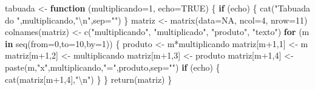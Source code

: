 \documentclass[
]{article}
\newenvironment{Shaded}{\begin{snugshade}}{\end{snugshade}}
\newcommand{\AttributeTok}[1]{\textcolor[rgb]{0.77,0.63,0.00}{#1}}
\newcommand{\ConstantTok}[1]{\textcolor[rgb]{0.00,0.00,0.00}{#1}}
\newcommand{\ControlFlowTok}[1]{\textcolor[rgb]{0.13,0.29,0.53}{\textbf{#1}}}
\newcommand{\DecValTok}[1]{\textcolor[rgb]{0.00,0.00,0.81}{#1}}
\newcommand{\FunctionTok}[1]{\textcolor[rgb]{0.00,0.00,0.00}{#1}}
\newcommand{\NormalTok}[1]{#1}
\newcommand{\OtherTok}[1]{\textcolor[rgb]{0.56,0.35,0.01}{#1}}
\newcommand{\SpecialCharTok}[1]{\textcolor[rgb]{0.00,0.00,0.00}{#1}}
\newcommand{\StringTok}[1]{\textcolor[rgb]{0.31,0.60,0.02}{#1}}
\begin{document}
\begin{Shaded}
\begin{Highlighting}[]
\NormalTok{tabuada }\OtherTok{\textless{}{-}} \ControlFlowTok{function}\NormalTok{ (}\AttributeTok{multiplicando=}\DecValTok{1}\NormalTok{, }\AttributeTok{echo=}\ConstantTok{TRUE}\NormalTok{)}
\NormalTok{\{}
  \ControlFlowTok{if}\NormalTok{ (echo)}
\NormalTok{  \{}
    \FunctionTok{cat}\NormalTok{(}\StringTok{"Tabuada do "}\NormalTok{,multiplicando,}\StringTok{"}\SpecialCharTok{\textbackslash{}n}\StringTok{"}\NormalTok{,}\AttributeTok{sep=}\StringTok{""}\NormalTok{)}
\NormalTok{  \}  }
\NormalTok{  matriz }\OtherTok{\textless{}{-}} \FunctionTok{matrix}\NormalTok{(}\AttributeTok{data=}\ConstantTok{NA}\NormalTok{, }\AttributeTok{ncol=}\DecValTok{4}\NormalTok{, }\AttributeTok{nrow=}\DecValTok{11}\NormalTok{)}
  \FunctionTok{colnames}\NormalTok{(matriz) }\OtherTok{\textless{}{-}} \FunctionTok{c}\NormalTok{(}\StringTok{"multiplicando"}\NormalTok{, }\StringTok{"multiplicado"}\NormalTok{, }\StringTok{"produto"}\NormalTok{, }\StringTok{"texto"}\NormalTok{)}
  \ControlFlowTok{for}\NormalTok{ (m }\ControlFlowTok{in} \FunctionTok{seq}\NormalTok{(}\AttributeTok{from=}\DecValTok{0}\NormalTok{,}\AttributeTok{to=}\DecValTok{10}\NormalTok{,}\AttributeTok{by=}\DecValTok{1}\NormalTok{))}
\NormalTok{  \{}
\NormalTok{    produto }\OtherTok{\textless{}{-}}\NormalTok{ m}\SpecialCharTok{*}\NormalTok{multiplicando}
\NormalTok{    matriz[m}\SpecialCharTok{+}\DecValTok{1}\NormalTok{,}\DecValTok{1}\NormalTok{] }\OtherTok{\textless{}{-}}\NormalTok{ m}
\NormalTok{    matriz[m}\SpecialCharTok{+}\DecValTok{1}\NormalTok{,}\DecValTok{2}\NormalTok{] }\OtherTok{\textless{}{-}}\NormalTok{ multiplicando}
\NormalTok{    matriz[m}\SpecialCharTok{+}\DecValTok{1}\NormalTok{,}\DecValTok{3}\NormalTok{] }\OtherTok{\textless{}{-}}\NormalTok{ produto}
\NormalTok{    matriz[m}\SpecialCharTok{+}\DecValTok{1}\NormalTok{,}\DecValTok{4}\NormalTok{] }\OtherTok{\textless{}{-}} \FunctionTok{paste}\NormalTok{(m,}\StringTok{"x"}\NormalTok{,multiplicando,}\StringTok{"="}\NormalTok{,produto,}\AttributeTok{sep=}\StringTok{""}\NormalTok{)}
    \ControlFlowTok{if}\NormalTok{ (echo)}
\NormalTok{    \{}
      \FunctionTok{cat}\NormalTok{(matriz[m}\SpecialCharTok{+}\DecValTok{1}\NormalTok{,}\DecValTok{4}\NormalTok{],}\StringTok{"}\SpecialCharTok{\textbackslash{}n}\StringTok{"}\NormalTok{)}
\NormalTok{    \}}
\NormalTok{  \}}
  \FunctionTok{return}\NormalTok{(matriz)}
\NormalTok{\}}
\end{Highlighting}
\end{Shaded}
\end{document}
